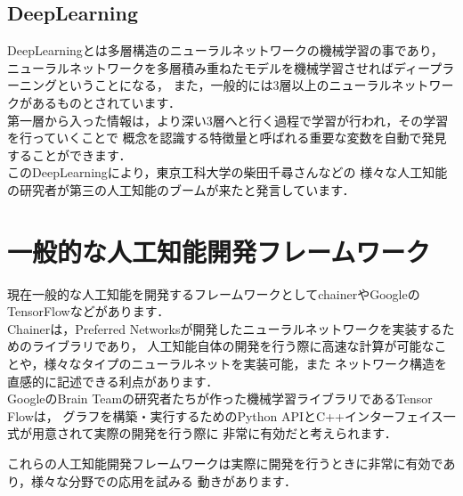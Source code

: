 \subsection{DeepLearning}
DeepLearning\cite{deep}とは多層構造のニューラルネットワークの機械学習の事であり，
ニューラルネットワークを多層積み重ねたモデルを機械学習させればディープラーニングということになる，
また，一般的には3層以上のニューラルネットワークがあるものとされています．
\\

第一層から入った情報は，より深い3層へと行く過程で学習が行われ，その学習を行っていくことで
概念を認識する特徴量と呼ばれる重要な変数を自動で発見することができます．
\\

このDeepLearningにより，東京工科大学の柴田千尋さん\cite{boom}などの
様々な人工知能の研究者が第三の人工知能のブームが来たと発言しています．
\\

\section{一般的な人工知能開発フレームワーク}
現在一般的な人工知能を開発するフレームワークとしてchainerやGoogleのTensorFlowなどがあります．
\\
Chainerは，Preferred Networksが開発したニューラルネットワークを実装するためのライブラリであり，
人工知能自体の開発を行う際に高速な計算が可能なことや，様々なタイプのニューラルネットを実装可能，また
ネットワーク構造を直感的に記述できる利点があります．
\\
GoogleのBrain Teamの研究者たちが作った機械学習ライブラリであるTensor Flowは，
グラフを構築・実行するためのPython APIとC++インターフェイス一式が用意されて実際の開発を行う際に
非常に有効だと考えられます．

これらの人工知能開発フレームワークは実際に開発を行うときに非常に有効であり，様々な分野での応用を試みる
動きがあります．
\\
